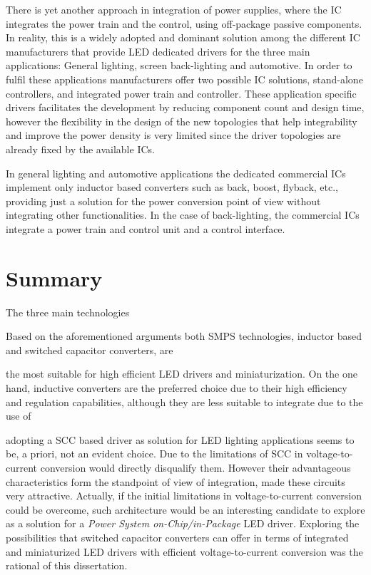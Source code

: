 There is yet another approach in integration of power supplies, where the IC integrates the power train and the control, using off-package  passive components. In reality, this is a widely adopted and dominant solution among the different IC manufacturers that provide LED dedicated drivers for the three main applications: General lighting, screen back-lighting and automotive. In order to fulfil these applications manufacturers offer two possible IC solutions, stand-alone controllers, and integrated power train and controller. These application specific drivers facilitates the development by reducing component count and design time, however the flexibility in the design of the new topologies that help integrability and improve the power density is very limited since the driver topologies are already fixed by the available ICs. 


In general lighting and automotive applications the dedicated commercial ICs implement only inductor based converters such as back, boost, flyback, etc., providing just a solution for the power conversion point of view without integrating other functionalities. In the case of back-lighting, the commercial ICs integrate a power train and control unit and a control interface. 





\section{Summary}
The three main technologies

Based on the aforementioned arguments both SMPS technologies, inductor based and switched capacitor converters,   are




the most suitable  for high efficient LED drivers and miniaturization. On the one hand, inductive converters are the preferred choice due to their high efficiency and regulation capabilities, although they are less suitable to integrate due to the use of

   adopting a SCC based driver as solution for LED lighting applications seems to be, a priori,  not an evident choice. Due to the limitations of SCC  in voltage-to-current conversion would directly disqualify them. However their advantageous characteristics form the standpoint of view of integration, made these circuits very attractive. Actually, if the initial limitations in voltage-to-current conversion could be overcome, such architecture would be an interesting candidate to explore as a solution for a \emph{Power System on-Chip/in-Package} LED driver.  Exploring the possibilities that switched capacitor converters can offer in terms of integrated and miniaturized LED drivers with efficient voltage-to-current conversion was the rational of this dissertation.

